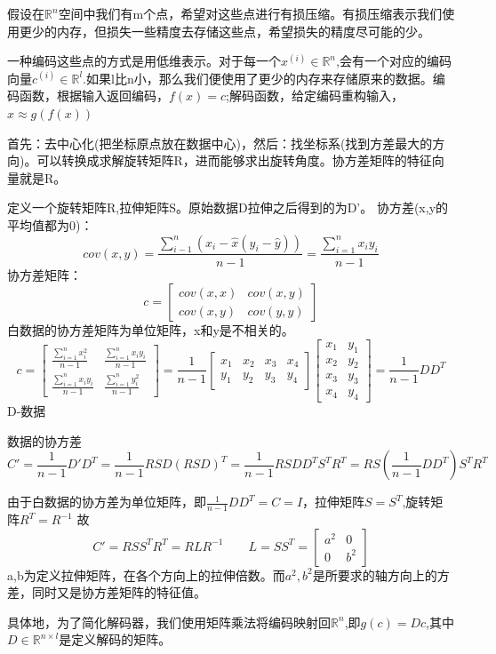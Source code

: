 \documentclass[openbib]{article}
\begin{document}
假设在$\mathbb{R}^n$空间中我们有m个点，希望对这些点进行有损压缩。有损压缩表示我们使用更少的内存，但损失一些精度去存储这些点，希望损失的精度尽可能的少。

一种编码这些点的方式是用低维表示。对于每一个$x^{(i)}\in \mathbb{R}^n$,会有一个对应的编码向量$c^{(i)}\in \mathbb{R}^l$.如果l比n小，那么我们便使用了更少的内存来存储原来的数据。编码函数，根据输入返回编码，$f(x)=c$;解码函数，给定编码重构输入，$x\approx g(f(x))$


首先：去中心化(把坐标原点放在数据中心)，然后：找坐标系(找到方差最大的方向)。可以转换成求解旋转矩阵R，进而能够求出旋转角度。协方差矩阵的特征向量就是R。

定义一个旋转矩阵R,拉伸矩阵S。原始数据D拉伸之后得到的为D'。
协方差(x,y的平均值都为0)：
$$cov(x,y)=\frac{\sum_{i-1}^{n}(x_i-\hat{x}(y_i-\hat{y}))}{n-1}=\frac{\sum_{i=1}^{n}x_iy_i}{n-1}$$
协方差矩阵：
$$c=\begin{bmatrix}
	cov(x,x) &cov(x,y)  \\
	cov(x,y)& cov(y,y)
\end{bmatrix}$$
白数据的协方差矩阵为单位矩阵，x和y是不相关的。
$$c=\begin{bmatrix}
	\frac{\sum_{i=1}^{n}x_i^2}{n-1} &\frac{\sum_{i=1}^{n}x_iy_i}{n-1}  \\
	\frac{\sum_{i=1}^{n}x_iy_i}{n-1}& \frac{\sum_{i=1}^{n}y_i^2}{n-1}
\end{bmatrix}=\frac{1}{n-1}\begin{bmatrix}
x_1 &x_2 &x_3 &x_4 \\
y_1 &y_2 &y_3 &y_4
\end{bmatrix}\begin{bmatrix}
x_1 &y_1 \\
x_2 &y_2 \\
x_3 &y_3 \\
x_4 &y_4
\end{bmatrix}=\frac{1}{n-1}DD^T$$
D-数据

数据的协方差$$
C' = \frac{1}{n-1}D'D^T=\frac{1}{n-1}RSD(RSD)^T=\frac{1}{n-1}RSDD^TS^TR^T=RS(\frac{1}{n-1}DD^T)S^TR^T$$

由于白数据的协方差为单位矩阵，即$\frac{1}{n-1}DD^T=C=I$，拉伸矩阵$S=S^T$,旋转矩阵$R^T=R^{-1}$
故
$$C' = RSS^TR^T=RLR^{-1} \qquad L=SS^T=\begin{bmatrix}
	a^2 & 0 \\
	0 & b^2
\end{bmatrix}$$
a,b为定义拉伸矩阵，在各个方向上的拉伸倍数。而$a^2,b^2$是所要求的轴方向上的方差，同时又是协方差矩阵的特征值。

具体地，为了简化解码器，我们使用矩阵乘法将编码映射回$\mathbb{R}^n$,即$g(c)=Dc$,其中$D\in \mathbb{R}^{n\times l}$是定义解码的矩阵。
\end{document}
